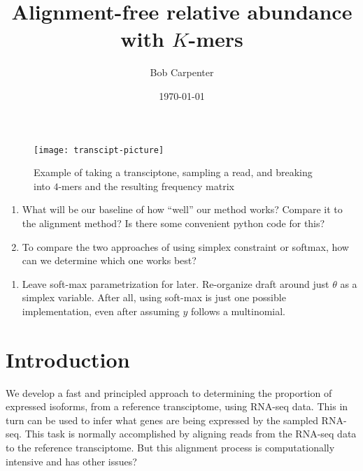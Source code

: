 \documentclass[11pt]{article}
\title{Alignment-free relative abundance with $K$-mers}
\author{Bob Carpenter}
\date{\today}
\newcommand{\rob}[1]{\todo[inline]{\textbf{Robert: }#1}}
\begin{document}
\maketitle



\begin{figure}
\centering
\texttt{[image: transcipt-picture]}
\caption{Example of taking a transciptone, sampling a read, and breaking into $4$-mers and the resulting frequency matrix}
\label{fig:transcipt-picture}
\end{figure}


\rob{Questions}
\begin{enumerate}
 \item What will be our baseline of how ``well'' our method works? Compare it to the alignment method? Is there some convenient python code for this?
\item  To compare the two approaches of using simplex constraint or softmax, how can we determine which one works best? 
\end{enumerate}

\rob{TODO}
\begin{enumerate}
\item Leave soft-max parametrization for later. Re-organize draft around just $\theta $ as a simplex variable. After all, using soft-max is just one possible  implementation, even after assuming $y$ follows a multinomial.
\end{enumerate}
\section{Introduction}

We develop a fast and principled approach to determining the proportion of expressed isoforms, from a reference transciptome, using  RNA-seq data. This in turn can be used to infer what genes are being expressed by the sampled RNA-seq. This task is normally accomplished by aligning reads from the RNA-seq data to the reference transciptome. But this alignment process is computationally intensive and has other issues? 
\end{document}
